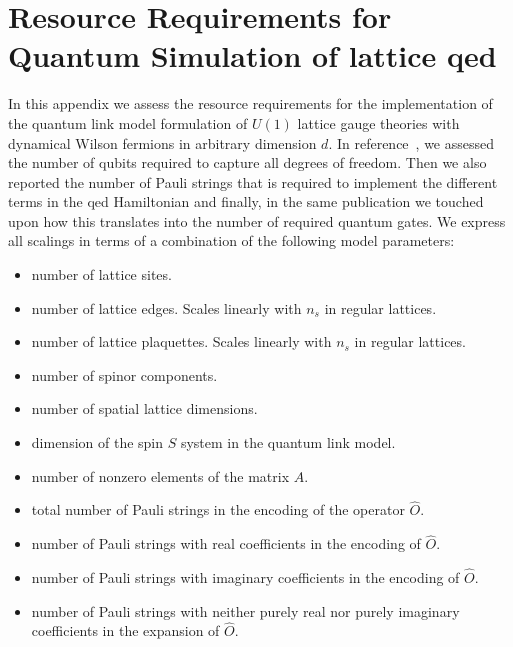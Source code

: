 \section{Resource Requirements for Quantum Simulation of lattice \gls{qed} \label{appendix_resources}}

In this appendix we assess the resource requirements for the implementation of the quantum link model formulation of $U(1)$ lattice gauge theories with dynamical Wilson fermions in arbitrary dimension $d$. 
In reference~\cite{Mathis2020}, we assessed the number of qubits required to capture all degrees of freedom. Then we also reported the number of Pauli strings that is required to implement the different terms in the \gls{qed} Hamiltonian and finally, in the same publication we touched upon how this translates into the number of required quantum gates. 
We express all scalings in terms of a combination of the following model parameters:
\begin{itemize}
    \setlength\itemsep{0pt}
    \item {} number of lattice sites.
    \item {} number of lattice edges. Scales linearly with $n_s$ in regular lattices.
    \item {} number of lattice plaquettes. Scales linearly with $n_s$ in regular lattices.
    \item {} number of spinor components.
    \item {} number of spatial lattice dimensions.
    \item {} dimension of the spin $S$ system in the quantum link model.
    \item {} number of nonzero elements of the matrix $A$.
    \item {} total number of Pauli strings in the encoding of the operator $\hat{O}$.
    \item {} number of Pauli strings with real coefficients in the encoding of $\hat{O}$.
    \item {} number of Pauli strings with imaginary coefficients in the encoding of $\hat{O}$.
    \item {} number of Pauli strings with neither purely real nor purely imaginary coefficients 
    in the expansion of $\hat{O}$.
\end{itemize}

